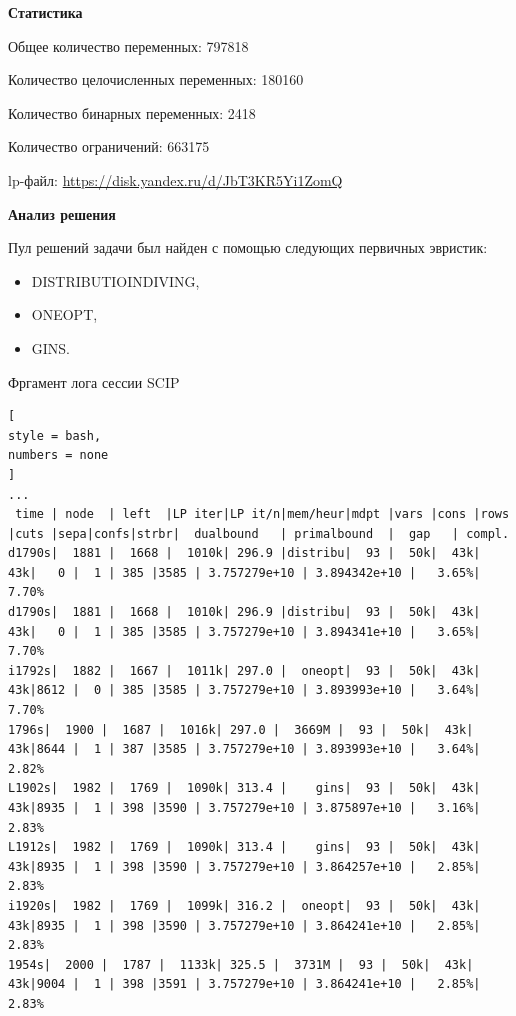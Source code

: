 \documentclass[%
	11pt,
	a4paper,
	utf8,
		]{article}
\begin{document}
\textbf{Статистика}\vspace*{1mm}

Общее количество переменных: 797818

Количество целочисленных переменных: 180160

Количество бинарных переменных: 2418

Количество ограничений: 663175

lp-файл: \url{https://disk.yandex.ru/d/JbT3KR5Yi1ZomQ}

\vspace*{5mm}\textbf{Анализ решения}\vspace*{1mm}

Пул решений задачи был найден с помощью следующих первичных эвристик:
\begin{itemize}
	\item DISTRIBUTIOINDIVING,
	
	\item ONEOPT,
	
	\item GINS.
\end{itemize}

Фргамент лога сессии SCIP
\begin{lstlisting}[
style = bash,
numbers = none
]
...
 time | node  | left  |LP iter|LP it/n|mem/heur|mdpt |vars |cons |rows |cuts |sepa|confs|strbr|  dualbound   | primalbound  |  gap   | compl. 
d1790s|  1881 |  1668 |  1010k| 296.9 |distribu|  93 |  50k|  43k|  43k|   0 |  1 | 385 |3585 | 3.757279e+10 | 3.894342e+10 |   3.65%|   7.70%
d1790s|  1881 |  1668 |  1010k| 296.9 |distribu|  93 |  50k|  43k|  43k|   0 |  1 | 385 |3585 | 3.757279e+10 | 3.894341e+10 |   3.65%|   7.70%
i1792s|  1882 |  1667 |  1011k| 297.0 |  oneopt|  93 |  50k|  43k|  43k|8612 |  0 | 385 |3585 | 3.757279e+10 | 3.893993e+10 |   3.64%|   7.70%
1796s|  1900 |  1687 |  1016k| 297.0 |  3669M |  93 |  50k|  43k|  43k|8644 |  1 | 387 |3585 | 3.757279e+10 | 3.893993e+10 |   3.64%|   2.82%
L1902s|  1982 |  1769 |  1090k| 313.4 |    gins|  93 |  50k|  43k|  43k|8935 |  1 | 398 |3590 | 3.757279e+10 | 3.875897e+10 |   3.16%|   2.83%
L1912s|  1982 |  1769 |  1090k| 313.4 |    gins|  93 |  50k|  43k|  43k|8935 |  1 | 398 |3590 | 3.757279e+10 | 3.864257e+10 |   2.85%|   2.83%
i1920s|  1982 |  1769 |  1099k| 316.2 |  oneopt|  93 |  50k|  43k|  43k|8935 |  1 | 398 |3590 | 3.757279e+10 | 3.864241e+10 |   2.85%|   2.83%
1954s|  2000 |  1787 |  1133k| 325.5 |  3731M |  93 |  50k|  43k|  43k|9004 |  1 | 398 |3591 | 3.757279e+10 | 3.864241e+10 |   2.85%|   2.83%
\end{lstlisting}
\end{document}
